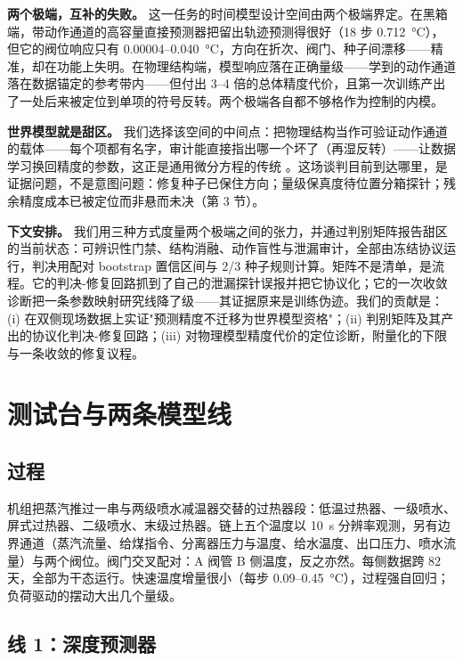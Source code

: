 \documentclass[11pt]{article}
\begin{document}
\textbf{两个极端，互补的失败。} 这一任务的时间模型设计空间由两个极端界定。在黑箱端，带动作通道的高容量直接预测器把留出轨迹预测得很好（18 步 0.712~\si{\degreeCelsius}），但它的阀位响应只有 0.00004--0.040~\si{\degreeCelsius}，方向在折次、阀门、种子间漂移——精准，却在功能上失明。在物理结构端，模型响应落在正确量级——学到的动作通道落在数据锚定的参考带内——但付出 3--4 倍的总体精度代价，且第一次训练产出了一处后来被定位到单项的符号反转。两个极端各自都不够格作为控制的内模。

\textbf{世界模型就是甜区。} 我们选择该空间的中间点：把物理结构当作可验证动作通道的载体——每个项都有名字，审计能直接指出哪一个坏了（再湿反转）——让数据学习换回精度的参数，这正是通用微分方程的传统 \cite{chen2018neuralode, rackauckas2020ude}。这场谈判目前到达哪里，是证据问题，不是意图问题：修复种子已保住方向；量级保真度待位置分箱探针；残余精度成本已被定位而非悬而未决（第 3 节）。

\textbf{下文安排。} 我们用三种方式度量两个极端之间的张力，并通过判别矩阵报告甜区的当前状态：可辨识性门禁、结构消融、动作盲性与泄漏审计，全部由冻结协议运行，判决用配对 bootstrap 置信区间与 2/3 种子规则计算。矩阵不是清单，是流程。它的判决-修复回路抓到了自己的泄漏探针误报并把它协议化；它的一次收敛诊断把一条参数映射研究线降了级——其证据原来是训练伪迹。我们的贡献是：(i) 在双侧现场数据上实证"预测精度不迁移为世界模型资格"；(ii) 判别矩阵及其产出的协议化判决-修复回路；(iii) 对物理模型精度代价的定位诊断，附量化的下限与一条收敛的修复议程。

\section{测试台与两条模型线}

\subsection{过程}

机组把蒸汽推过一串与两级喷水减温器交替的过热器段：低温过热器、一级喷水、屏式过热器、二级喷水、末级过热器。链上五个温度以 10~s 分辨率观测，另有边界通道（蒸汽流量、给煤指令、分离器压力与温度、给水温度、出口压力、喷水流量）与两个阀位。阀门交叉配对：A 阀管 B 侧温度，反之亦然。每侧数据跨 82 天，全部为干态运行。快速温度增量很小（每步 0.09--0.45~\si{\degreeCelsius}），过程强自回归；负荷驱动的摆动大出几个量级。

\subsection{线 1：深度预测器}
\end{document}
